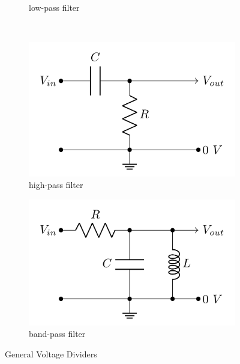 \documentclass[10pt]{PhysLab1C} %
\begin{document}
\begin{figure}[ht]
\begin{subfigure}[t]{0.3\textwidth}
 \caption{low-pass filter}
 \label{low-pass-2}
 \end{subfigure}\\
 \medskip
 \begin{subfigure}[t]{0.3\textwidth}
 \centering
\includegraphics[width=\textwidth]{lab3fig/high-pass-2.png}

 \caption{high-pass filter}
 \label{high-pass-2}
 \end{subfigure}
\hspace{1.1cm}%
 \begin{subfigure}[t]{0.3\textwidth}
\centering
\includegraphics[width=\textwidth]{lab3fig/band-pass-2.png}

 \caption{band-pass filter}
 \label{band-pass-2}
 \end{subfigure}
  \medskip
 \caption{General Voltage Dividers}
 \label{dividers}
 \end{figure}
\end{document}
